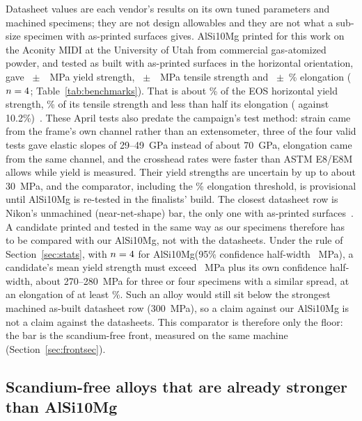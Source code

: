 \documentclass[preprint,12pt]{elsarticle}
\newcommand{\note}[1]{}
\newcommand{\note}[1]{\textcolor{blue!70!black}{\textsf{\footnotesize [Note: #1]}}}
\newcommand{\AlSi}{AlSi10Mg\xspace}
\begin{document}
Datasheet values are each vendor's results on its own tuned parameters and machined specimens; they are not design allowables and they are not what a sub-size specimen with as-printed surfaces gives.
\AlSi printed for this work on the Aconity MIDI at the University of Utah from commercial gas-atomized powder, and tested as built with as-printed surfaces in the horizontal orientation, gave \InhouseYS~$\pm$~\InhouseYSsd~MPa yield strength, \InhouseUTS~$\pm$~\InhouseUTSsd~MPa tensile strength and \InhouseEL~$\pm$~\InhouseELsd\% elongation ($n=4$; Table~\ref{tab:benchmarks}).
That is about \InhouseYSpctEOS\% of the EOS horizontal yield strength, \InhouseUTSpctEOS\% of its tensile strength and less than half its elongation (\InhouseEL{} against 10.2\%)~\cite{ds_eos}.
These April tests also predate the campaign's test method: strain came from the frame's own channel rather than an extensometer, three of the four valid tests gave elastic slopes of 29--49~GPa instead of about 70~GPa, elongation came from the same channel, and the crosshead rates were faster than ASTM E8/E8M allows while yield is measured. Their yield strengths are uncertain by up to about 30~MPa, and the comparator, including the \InhouseEL\% elongation threshold, is provisional until \AlSi is re-tested in the finalists' build.
The closest datasheet row is Nikon's unmachined (near-net-shape) bar, the only one with as-printed surfaces~\cite{ds_nikon}.
A candidate printed and tested in the same way as our specimens therefore has to be compared with our \AlSi, not with the datasheets.
Under the rule of Section~\ref{sec:stats}, with $n = 4$ for \AlSi (95\% confidence half-width \InhouseYShw~MPa), a candidate's mean yield strength must exceed \YSbar~MPa plus its own confidence half-width, about 270--280~MPa for three or four specimens with a similar spread, at an elongation of at least \InhouseEL\%. Such an alloy would still sit below the strongest machined as-built datasheet row (\SI{300}{MPa}), so a claim against our \AlSi is not a claim against the datasheets. This comparator is therefore only the floor: the bar is the scandium-free front, measured on the same machine (Section~\ref{sec:frontsec}).
\note{This comparator is provisional: the April strain channel was unreliable for three of the four valid tests, and the powder was commercial. The finalists' build will contain both commercial and in-house \AlSi-type powder, with an extensometer, and those values replace these.}

\subsection{Scandium-free alloys that are already stronger than \AlSi}
\end{document}
